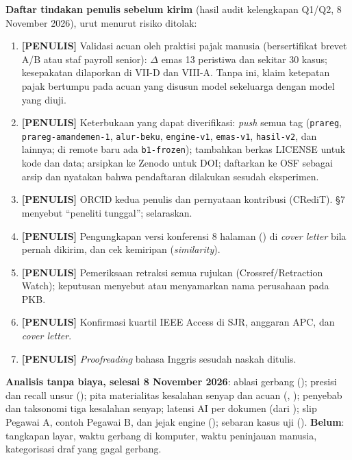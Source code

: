\documentclass{ieeeaccess}
\newcommand{\PENULIS}{\textcolor{stpenulis}{\textbf{[PENULIS]}}}
\newenvironment{isi}{\par\smallskip\footnotesize\color{draftblue}\noindent}{\par\smallskip\normalsize\color{black}}
\begin{document}
\begin{isi}
\textbf{Daftar tindakan penulis sebelum kirim} (hasil audit kelengkapan Q1/Q2, 8 November 2026), urut menurut risiko ditolak:
\begin{enumerate}
\item \PENULIS{} Validasi acuan oleh praktisi pajak manusia (bersertifikat brevet A/B atau staf payroll senior): $\Delta$ emas 13 peristiwa dan sekitar 30 kasus; kesepakatan dilaporkan di VII-D dan VIII-A. Tanpa ini, klaim ketepatan pajak bertumpu pada acuan yang disusun model sekeluarga dengan model yang diuji.
\item \PENULIS{} Keterbukaan yang dapat diverifikasi: \textit{push} semua tag (\texttt{prareg}, \texttt{prareg-amandemen-1}, \texttt{alur-beku}, \texttt{engine-v1}, \texttt{emas-v1}, \texttt{hasil-v2}, dan lainnya; di remote baru ada \texttt{b1-frozen}); tambahkan berkas LICENSE untuk kode dan data; arsipkan ke Zenodo untuk DOI; daftarkan  ke OSF sebagai arsip dan nyatakan bahwa pendaftaran dilakukan sesudah eksperimen.
\item \PENULIS{} ORCID kedua penulis dan pernyataan kontribusi (CRediT).  \S7 menyebut ``peneliti tunggal''; selaraskan.
\item \PENULIS{} Pengungkapan versi konferensi 8 halaman () di \textit{cover letter} bila pernah dikirim, dan cek kemiripan (\textit{similarity}).
\item \PENULIS{} Pemeriksaan retraksi semua rujukan (Crossref/Retraction Watch); keputusan menyebut atau menyamarkan nama perusahaan pada PKB.
\item \PENULIS{} Konfirmasi kuartil IEEE Access di SJR, anggaran APC, dan \textit{cover letter}.
\item \PENULIS{} \textit{Proofreading} bahasa Inggris sesudah naskah ditulis.
\end{enumerate}
\textbf{Analisis tanpa biaya, selesai 8 November 2026}: ablasi gerbang (); presisi dan recall unsur (); pita materialitas kesalahan senyap dan acuan (, ); penyebab dan taksonomi tiga kesalahan senyap; latensi AI per dokumen (dari ); slip Pegawai A, contoh Pegawai B, dan jejak engine (); sebaran kasus uji (). \textbf{Belum}: tangkapan layar, waktu gerbang di komputer, waktu peninjauan manusia, kategorisasi draf yang gagal gerbang.
\end{isi}
\end{document}
